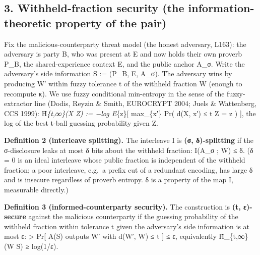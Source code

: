 \documentclass[
  11pt,
]{article}
\begin{document}
\subsection{3. Withheld-fraction security (the information-theoretic
property of the
pair)}\label{withheld-fraction-security-the-information-theoretic-property-of-the-pair}

Fix the malicious-counterparty threat model (the honest adversary,
L163): the adversary is party B, who was present at E and now holds
their own proverb P\_B, the shared-experience context E, and the public
anchor A\_σ. Write the adversary's side information S := (P\_B, E,
A\_σ). The adversary wins by producing W′ within fuzzy tolerance t of
the withheld fraction W (enough to recompute κ). We use fuzzy
conditional min-entropy in the sense of the fuzzy-extractor line (Dodis,
Reyzin \& Smith, EUROCRYPT 2004; Juels \& Wattenberg, CCS 1999):
H̃\emph{\{t,∞\}(X \textbar{} Z) := −log E}\{z\}{[} max\_\{x′\} Pr( d(X,
x′) ≤ t \textbar{} Z = z ) {]}, the log of the best t-ball guessing
probability given Z.

\textbf{Definition 2 (interleave splitting).} The interleave I is
\textbf{(σ, δ)-splitting} if the σ-disclosure leaks at most δ bits about
the withheld fraction: I(A\_σ ; W) ≤ δ. (δ = 0 is an ideal interleave
whose public fraction is independent of the withheld fraction; a poor
interleave, e.g.~a prefix cut of a redundant encoding, has large δ and
is insecure regardless of proverb entropy. δ is a property of the map I,
measurable directly.)

\textbf{Definition 3 (informed-counterparty security).} The construction
is \textbf{(t, ε)-secure} against the malicious counterparty if the
guessing probability of the withheld fraction within tolerance t given
the adversary's side information is at most ε: \textgreater{} Pr{[} A(S)
outputs W′ with d(W′, W) ≤ t {]} ≤ ε, equivalently H̃\_\{t,∞\}(W
\textbar{} S) ≥ log(1/ε).
\end{document}
